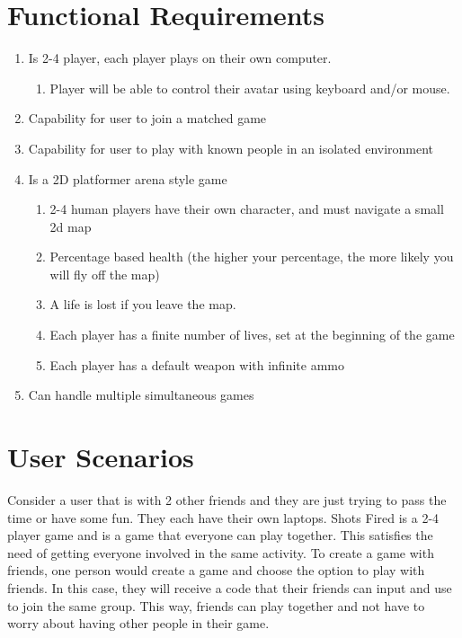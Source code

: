 \documentclass[11pt, oneside]{article}   	%
\begin{document}
\clearpage

\section{Functional Requirements}
\begin{enumerate}
\item Is 2-4 player, each player plays on their own computer. 
\begin{enumerate}
\item Player will be able to control their avatar using keyboard and/or mouse. 
\end{enumerate}
\item Capability for user to join a matched game
\item Capability for user to play with known people in an isolated environment
\item Is a 2D platformer arena style game
\begin{enumerate}
\item 2-4 human players have their own character, and must navigate a small 2d map
\item Percentage based health (the higher your percentage, the more likely you will fly off the map) 
\item A life is lost if you leave the map.
\item Each player has a finite number of lives, set at the beginning of the game
\item Each player has a default weapon with infinite ammo
\end{enumerate}
\item Can handle multiple simultaneous games
\end{enumerate}

\section{User Scenarios}

Consider a user that is with 2 other friends and they are just trying to pass the time or have some fun. They each have their own laptops. Shots Fired is a 2-4 player game and is a game that everyone can play together. This satisfies the need of getting everyone involved in the same activity. To create a game with friends, one person would create a game and choose the option to play with friends. In this case, they will receive a code that their friends can input and use to join the same group. This way, friends can play together and not have to worry about having other people in their game. \\
\end{document}
